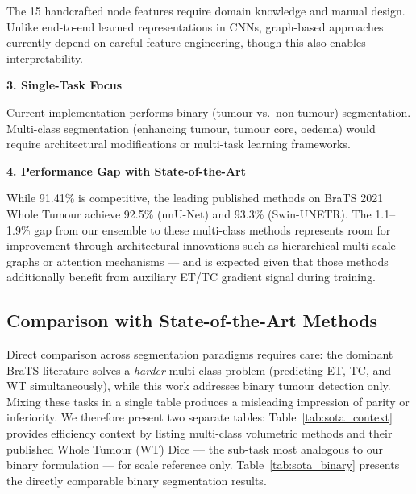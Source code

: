 The 15 handcrafted node features require domain knowledge and manual design. Unlike end-to-end learned representations in CNNs, graph-based approaches currently depend on careful feature engineering, though this also enables interpretability.

\textbf{3. Single-Task Focus}

Current implementation performs binary (tumour vs.\ non-tumour) segmentation. Multi-class segmentation (enhancing tumour, tumour core, oedema) would require architectural modifications or multi-task learning frameworks.

\textbf{4. Performance Gap with State-of-the-Art}

While 91.41\% is competitive, the leading published methods on BraTS 2021 Whole Tumour achieve 92.5\% (nnU-Net) and 93.3\% (Swin-UNETR). The 1.1--1.9\% gap from our ensemble to these multi-class methods represents room for improvement through architectural innovations such as hierarchical multi-scale graphs or attention mechanisms — and is expected given that those methods additionally benefit from auxiliary ET/TC gradient signal during training.


\subsection{Comparison with State-of-the-Art Methods}

Direct comparison across segmentation paradigms requires care: the dominant BraTS literature solves a \textit{harder} multi-class problem (predicting ET, TC, and WT simultaneously), while this work addresses binary tumour detection only. Mixing these tasks in a single table produces a misleading impression of parity or inferiority. We therefore present two separate tables: Table~\ref{tab:sota_context} provides efficiency context by listing multi-class volumetric methods and their published Whole Tumour (WT) Dice — the sub-task most analogous to our binary formulation — for scale reference only. Table~\ref{tab:sota_binary} presents the directly comparable binary segmentation results.

